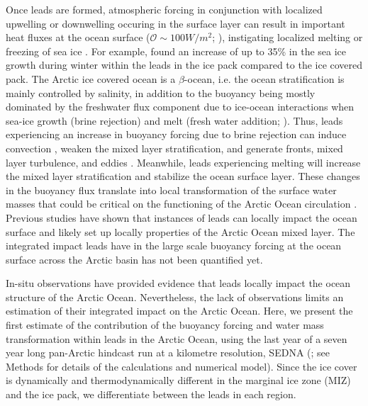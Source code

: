 \documentclass[lineno,sn-basic]{sn-jnl}%
\begin{document}
Once leads are formed, atmospheric forcing in conjunction with localized upwelling or downwelling occuring in the surface layer can result in important heat fluxes at the ocean surface ($\mathcal{O} \sim 100 W/m^2$; \citealp{Bourgault_flux_lkf_2020,McPhee_LKF_2005,Marcq_flux_lead_2012,Maykut_heat_1986}), instigating localized melting or freezing of sea ice \citep{Albedyll_thickness_dis_2022}. For example, \citet{Boutin_rheology_2023} found an increase of up to 35\% in the sea ice growth during winter within the leads in the ice pack compared to the ice covered pack. The Arctic ice covered ocean is a $\beta$-ocean, i.e. the ocean stratification is mainly controlled by salinity, in addition to the buoyancy being mostly dominated by the freshwater flux component due to ice-ocean interactions when sea-ice growth (brine rejection) and melt (fresh water addition; \citealp{Carmack_beta_ocean_2007}). Thus, leads experiencing an increase in buoyancy forcing due to brine rejection can induce convection \citep{Smith_convection_1998}, weaken the mixed layer stratification, and generate fronts, mixed layer turbulence, and eddies \citep{Reiser_LKF_2020, Smith_generation_2002}. Meanwhile, leads experiencing melting will increase the mixed layer stratification and stabilize the ocean surface layer. These changes in the buoyancy flux translate into local transformation of the surface water masses that could be critical on the functioning of the Arctic Ocean circulation \citep{Lenn_mixing_2022, Pemberton_WMT_2015, Smith_polynyas_1990}. 
Previous studies have shown that instances of leads can locally impact the ocean surface and likely set up locally properties of the Arctic Ocean mixed layer. The integrated impact leads have in the large scale  buoyancy forcing at the ocean surface across the Arctic basin has not been quantified yet.

In-situ observations have provided evidence that leads locally impact the ocean structure of the Arctic Ocean. Nevertheless, the lack of observations limits an estimation of their integrated impact on the Arctic Ocean. Here, we present the first estimate of the contribution of the buoyancy forcing and water mass transformation within leads in the Arctic Ocean, using the last year of a seven year long pan-Arctic hindcast run at a kilometre resolution, SEDNA (\citealp{SEDNA_2023}; see Methods for details of the calculations and numerical model). Since the ice cover is dynamically and thermodynamically different in the marginal ice zone (MIZ) and the ice pack, we differentiate between the leads in each region. %
\end{document}
